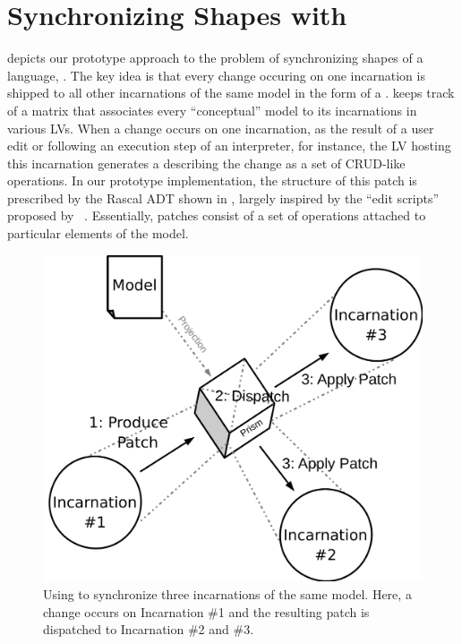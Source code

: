 \section{Synchronizing Shapes with \prism}
\label{sec:prism}


 depicts our prototype approach to the problem of synchronizing shapes of a language, \prism.
The key idea is that every change occuring on one incarnation is shipped to all other incarnations of the same model in the form of a \patch.
\prism keeps track of a matrix that associates every ``conceptual'' model to its incarnations in various LVs.
When a change occurs on one incarnation, as the result of a user edit or following an execution step of an interpreter, for instance, the LV hosting this incarnation generates a \patch describing the change as a set of CRUD-like operations.
In our prototype implementation, the structure of this patch is prescribed by the Rascal ADT shown in , largely inspired by the ``edit scripts'' proposed by \citeauthor{rozen2017towards}~\cite{rozen2017towards}.
Essentially, patches consist of a set of operations attached to particular elements of the model.


\begin{figure}[bt]
	\centering
	\includegraphics[width=.6\columnwidth]{figures/prism}
	\caption{Using \prism to synchronize three incarnations of the same model. Here, a change occurs on Incarnation \#1 and the resulting patch is dispatched to Incarnation \#2 and \#3.}
	\label{fig:prism}
\end{figure}

